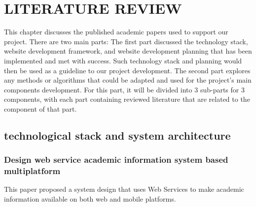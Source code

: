 \chapter{LITERATURE REVIEW}
	
	
\newcommand{\funcgroup}[1]{%
	\vspace{\baselineskip}%
	\noindent{\bfseries\fontsize{12}{14.4}\selectfont #1}%
	\vspace{0.1pt}\par%
}

	
This chapter discusses the published academic papers used to support our project. There are two main parts: The first part discussed the technology stack, website development framework, and website development planning that has been implemented and met with success. Such technology stack and planning would then be used as a guideline to our project development. The second part explores any methods or algorithms that could be adapted and used for the project’s main components development. For this part, it will be divided into 3 sub-parts for 3 components, with each part containing reviewed literature that are related to the component of that part.

\section{technological stack and system architecture}

\subsection{Design web service academic information system based multiplatform \cite{paper_10}}

This paper proposed a system design that uses Web Services to make academic information available on both web and mobile platforms.

